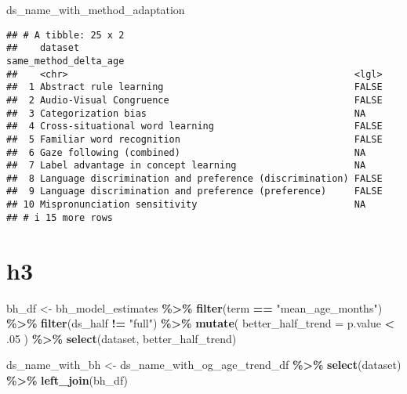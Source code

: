 \documentclass[
]{article}
\newenvironment{Shaded}{\begin{snugshade}}{\end{snugshade}}
\newcommand{\AttributeTok}[1]{\textcolor[rgb]{0.13,0.29,0.53}{#1}}
\newcommand{\DecValTok}[1]{\textcolor[rgb]{0.00,0.00,0.81}{#1}}
\newcommand{\FunctionTok}[1]{\textcolor[rgb]{0.13,0.29,0.53}{\textbf{#1}}}
\newcommand{\NormalTok}[1]{#1}
\newcommand{\OtherTok}[1]{\textcolor[rgb]{0.56,0.35,0.01}{#1}}
\newcommand{\SpecialCharTok}[1]{\textcolor[rgb]{0.81,0.36,0.00}{\textbf{#1}}}
\newcommand{\StringTok}[1]{\textcolor[rgb]{0.31,0.60,0.02}{#1}}
\begin{document}
\begin{Shaded}
\begin{Highlighting}[]
\NormalTok{ds\_name\_with\_method\_adaptation}
\end{Highlighting}
\end{Shaded}

\begin{verbatim}
## # A tibble: 25 x 2
##    dataset                                                 same_method_delta_age
##    <chr>                                                   <lgl>                
##  1 Abstract rule learning                                  FALSE                
##  2 Audio-Visual Congruence                                 FALSE                
##  3 Categorization bias                                     NA                   
##  4 Cross-situational word learning                         FALSE                
##  5 Familiar word recognition                               FALSE                
##  6 Gaze following (combined)                               NA                   
##  7 Label advantage in concept learning                     NA                   
##  8 Language discrimination and preference (discrimination) FALSE                
##  9 Language discrimination and preference (preference)     FALSE                
## 10 Mispronunciation sensitivity                            NA                   
## # i 15 more rows
\end{verbatim}

\hypertarget{h3}{%
\section{h3}\label{h3}}

\begin{Shaded}
\begin{Highlighting}[]
\NormalTok{bh\_df }\OtherTok{\textless{}{-}}\NormalTok{ bh\_model\_estimates }\SpecialCharTok{\%\textgreater{}\%} 
  \FunctionTok{filter}\NormalTok{(term }\SpecialCharTok{==} \StringTok{"mean\_age\_months"}\NormalTok{) }\SpecialCharTok{\%\textgreater{}\%} 
  \FunctionTok{filter}\NormalTok{(ds\_half }\SpecialCharTok{!=} \StringTok{"full"}\NormalTok{) }\SpecialCharTok{\%\textgreater{}\%} 
  \FunctionTok{mutate}\NormalTok{(}
    \AttributeTok{better\_half\_trend =}\NormalTok{ p.value }\SpecialCharTok{\textless{}}\NormalTok{ .}\DecValTok{05}
\NormalTok{  ) }\SpecialCharTok{\%\textgreater{}\%} 
  \FunctionTok{select}\NormalTok{(dataset, better\_half\_trend)}

\NormalTok{ds\_name\_with\_bh }\OtherTok{\textless{}{-}}\NormalTok{ ds\_name\_with\_og\_age\_trend\_df }\SpecialCharTok{\%\textgreater{}\%} 
  \FunctionTok{select}\NormalTok{(dataset) }\SpecialCharTok{\%\textgreater{}\%} 
  \FunctionTok{left\_join}\NormalTok{(bh\_df)}
\end{Highlighting}
\end{Shaded}
\end{document}
